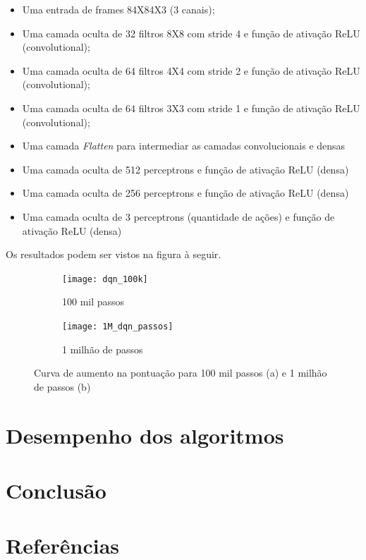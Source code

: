 \documentclass[letterpaper]{article} %
\begin{document}
\begin{itemize}
	\item Uma entrada de frames 84X84X3 (3 canais);
	\item Uma camada oculta de 32 filtros 8X8 com stride 4 e função de ativação ReLU (convolutional);
	\item Uma camada oculta de 64 filtros 4X4 com stride 2 e função de ativação ReLU (convolutional);
	\item Uma camada oculta de 64 filtros 3X3 com stride 1 e função de ativação ReLU (convolutional);
	\item Uma camada \textit{Flatten} para intermediar as camadas convolucionais e densas
	\item Uma camada oculta de 512 perceptrons e função de ativação ReLU (densa)
	\item Uma camada oculta de 256 perceptrons e função de ativação ReLU (densa)
	\item Uma camada oculta de 3 perceptrons (quantidade de ações) e função de ativação ReLU (densa)
\end{itemize}

Os resultados podem ser vistos na figura à seguir.

\begin{figure}[h]
     \begin{subfigure}[h]{0.2\textwidth}
         \centering
         \texttt{[image: dqn\_100k]}
         \caption{100 mil passos}
     \end{subfigure}
     \hfill
     \begin{subfigure}[h]{0.2\textwidth}
         \texttt{[image: 1M\_dqn\_passos]}
         \caption{1 milhão de passos}
     \end{subfigure}
        \caption{Curva de aumento na pontuação para 100 mil passos (a) e 1 milhão de passos (b)}
\end{figure}

\section{Desempenho dos algoritmos}



\section{Conclusão}

\section{Referências}
\end{document}
